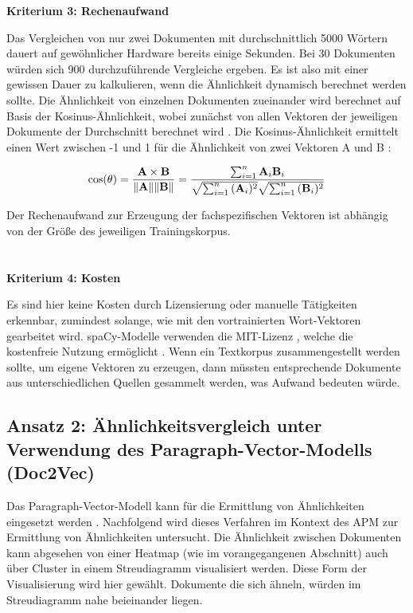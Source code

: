 {\bf Kriterium 3: Rechenaufwand}

Das Vergleichen von nur zwei Dokumenten mit durchschnittlich 5000 Wörtern dauert auf gewöhnlicher Hardware bereits einige Sekunden. Bei 30 Dokumenten würden sich 900 durchzuführende Vergleiche ergeben. Es ist also mit einer gewissen Dauer zu kalkulieren, wenn die Ähnlichkeit dynamisch berechnet werden sollte. Die Ähnlichkeit von einzelnen Dokumenten zueinander wird berechnet auf Basis der Kosinus-Ähnlichkeit, wobei zunächst von allen Vektoren der jeweiligen Dokumente der Durchschnitt berechnet wird \cite{spacy3}. Die Kosinus-Ähnlichkeit ermittelt einen Wert zwischen -1 und 1 für die Ähnlichkeit von zwei Vektoren A und B \cite[S. 84]{Gupta}:	
 
 \begin{equation}
\cos (\theta)= {{\bf A} \times {\bf B} \over \|{\bf A}\| \|{\bf B}\|} = \frac{ \sum_{i=1}^{n}{{\bf A}_i{\bf B}_i} }{ \sqrt{\sum_{i=1}^{n}{({\bf A}_i)^2}} \sqrt{\sum_{i=1}^{n}{({\bf B}_i)^2}} }
\end{equation}

Der Rechenaufwand zur Erzeugung der fachspezifischen Vektoren ist abhängig von der Größe des jeweiligen Trainingskorpus. 
\\
\\
\\ 

{\bf Kriterium 4: Kosten}

Es sind hier keine Kosten durch Lizensierung oder manuelle Tätigkeiten erkennbar, zumindest solange, wie mit den vortrainierten Wort-Vektoren gearbeitet wird. spaCy-Modelle verwenden die MIT-Lizenz \cite{spacy-license}, welche die kostenfreie Nutzung ermöglicht \cite{MIT}. Wenn ein Textkorpus zusammengestellt werden sollte, um eigene Vektoren zu erzeugen, dann müssten entsprechende Dokumente aus unterschiedlichen Quellen gesammelt werden, was Aufwand bedeuten würde.


\subsection{Ansatz 2: Ähnlichkeitsvergleich unter Verwendung des Paragraph-Vector-Modells (Doc2Vec)}

Das Paragraph-Vector-Modell kann für die Ermittlung von Ähnlichkeiten eingesetzt werden \cite{Dai}. Nachfolgend wird dieses Verfahren im Kontext des APM zur Ermittlung von Ähnlichkeiten untersucht. Die Ähnlichkeit zwischen Dokumenten kann abgesehen von einer Heatmap (wie im vorangegangenen Abschnitt) auch über Cluster in einem Streudiagramm visualisiert werden. Diese Form der Visualisierung wird hier gewählt. Dokumente die sich ähneln, würden im Streudiagramm nahe beieinander liegen. 

